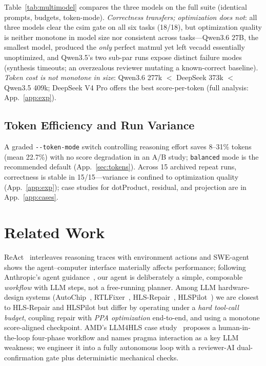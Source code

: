 \documentclass[10pt,conference,letterpaper]{IEEEtran}
\begin{document}
Table~\ref{tab:multimodel} compares the three models on the full suite (identical prompts, budgets, token-mode). \emph{Correctness transfers; optimization does not}: all three models clear the csim gate on all six tasks (18/18), but optimization quality is neither monotone in model size nor consistent across tasks---Qwen3.6 27B, the smallest model, produced the \emph{only} perfect matmul yet left vecadd essentially unoptimized, and Qwen3.5's two sub-par runs expose distinct failure modes (synthesis timeouts; an overzealous reviewer mutating a known-correct baseline). \emph{Token cost is not monotone in size}: Qwen3.6 277k $<$ DeepSeek 373k $<$ Qwen3.5 409k; DeepSeek V4 Pro offers the best score-per-token (full analysis: App.~\ref{app:exp}).

\subsection{Token Efficiency and Run Variance}

A graded \texttt{-{}-token-mode} switch controlling reasoning effort saves 8--31\% tokens (mean 22.7\%) with no score degradation in an A/B study; \texttt{balanced} mode is the recommended default (App.~\ref{sec:tokens}). Across 15 archived repeat runs, correctness is stable in 15/15---variance is confined to optimization quality (App.~\ref{app:exp}); case studies for dotProduct, residual, and projection are in App.~\ref{app:cases}.

\section{Related Work}

ReAct~\cite{react} interleaves reasoning traces with environment actions and SWE-agent~\cite{sweagent} shows the agent--computer interface materially affects performance; following Anthropic's agent guidance~\cite{anthropicagents}, our agent is deliberately a simple, composable \emph{workflow} with LLM steps, not a free-running planner. Among LLM hardware-design systems (AutoChip~\cite{autochip}, RTLFixer~\cite{rtlfixer}, HLS-Repair~\cite{hlsrepair}, HLSPilot~\cite{hlspilot}) we are closest to HLS-Repair and HLSPilot but differ by operating under a \emph{hard tool-call budget}, coupling repair with \emph{PPA optimization} end-to-end, and using a monotone score-aligned checkpoint. AMD's LLM4HLS case study~\cite{amdllm4hls} proposes a human-in-the-loop four-phase workflow and names pragma interaction as a key LLM weakness; we engineer it into a fully autonomous loop with a reviewer-AI dual-confirmation gate plus deterministic mechanical checks.
\end{document}
